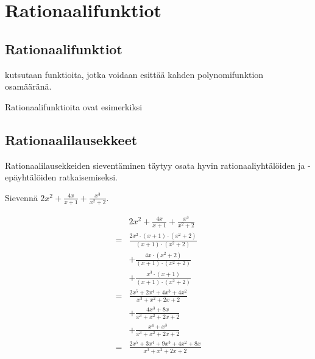 \chapter{Rationaalifunktiot}

\section{Rationaalifunktiot} %

 kutsutaan funktioita, jotka voidaan esittää kahden
polynomifunktion osamääränä.

\begin{esimerkki}
	Rationaalifunktioita ovat esimerkiksi
	\begin{alakohdat}
	\end{alakohdat}
\end{esimerkki}

\section{Rationaalilausekkeet} %

Rationaalilausekkeiden sieventäminen täytyy osata hyvin rationaaliyhtälöiden ja -epäyhtälöiden
ratkaisemiseksi.

\begin{esimerkki}
	Sievennä $2x^2 + \frac{4x}{x+1} + \frac{x^3}{x^2+2}$.
	\begin{esimratk}
		\begin{align*}
			  &2x^2 + \frac{4x}{x+1} + \frac{x^3}{x^2+2} \\
			= &\frac{2x^2 \cdot (x+1) \cdot (x^2+2)}{(x+1) \cdot (x^2+2)} \\
			  &+ \frac{4x \cdot (x^2+2)}{(x+1) \cdot (x^2+2)} \\
			  &+ \frac{x^3 \cdot (x+1)}{(x+1) \cdot (x^2+2)} \\
			= &\frac{2x^5 + 2x^4 + 4x^3 + 4x^2}{x^3+x^2+2x+2} \\
			  &+ \frac{4x^3+8x}{x^3+x^2+2x+2} \\
			  &+ \frac{x^4+x^3}{x^3+x^2+2x+2} \\
			= &\frac{2x^5+3x^4+9x^3+4x^2+8x}{x^3+x^2+2x+2}
		\end{align*}
	\end{esimratk}
\end{esimerkki}

